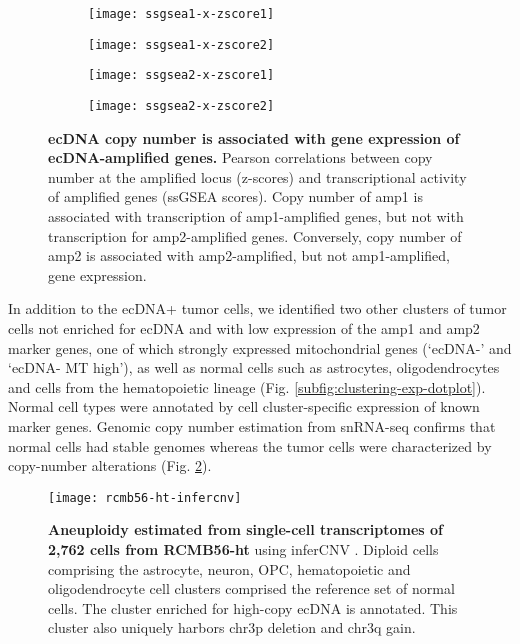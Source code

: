 \begin{figure}[!h]
    \centering
    \begin{subfigure}{.49\textwidth}
        \centering
        \texttt{[image: ssgsea1-x-zscore1]}
        \caption{}
    \end{subfigure}
    \begin{subfigure}{.49\textwidth}
        \centering
        \texttt{[image: ssgsea1-x-zscore2]}
        \caption{}
    \end{subfigure}
    \begin{subfigure}{.49\textwidth}
        \centering
        \texttt{[image: ssgsea2-x-zscore1]}
        \caption{}
    \end{subfigure}
    \begin{subfigure}{.49\textwidth}
        \centering
        \texttt{[image: ssgsea2-x-zscore2]}
        \caption{}
    \end{subfigure}
    \caption[ecDNA copy number is associated with gene expression of ecDNA-amplified genes.]{\textbf{ecDNA copy number is associated with gene expression of ecDNA-amplified genes.} Pearson correlations between copy number at the amplified locus (z-scores) and transcriptional activity of amplified genes (ssGSEA scores). Copy number of amp1 is associated with transcription of amp1-amplified genes, but not with transcription for amp2-amplified genes. Conversely, copy number of amp2 is associated with amp2-amplified, but not amp1-amplified, gene expression. 
    }
    \label{fig:ssgsea-x-zscores}
\end{figure}

In addition to the ecDNA+ tumor cells, we identified two other clusters of tumor cells not enriched for ecDNA and with low expression of the amp1 and amp2 marker genes, one of which strongly expressed mitochondrial genes (`ecDNA-' and `ecDNA- MT high'), as well as normal cells such as astrocytes, oligodendrocytes and cells from the hematopoietic lineage (Fig. \ref{subfig:clustering-exp-dotplot}). Normal cell types were annotated by cell cluster-specific expression of known marker genes. Genomic copy number estimation from snRNA-seq confirms that normal cells had stable genomes whereas the tumor cells were characterized by copy-number alterations (Fig. \ref{fig:rcmb56-ht-infercnv}). 

\begin{figure}[!h]
    \centering
    \texttt{[image: rcmb56-ht-infercnv]}
    \caption[Aneuploidy estimated from single-cell transcriptomes of 2,762 cells from RCMB56-ht]{\textbf{Aneuploidy estimated from single-cell transcriptomes of 2,762 cells from RCMB56-ht} using inferCNV \cite{inferCNV_2019}. Diploid cells comprising the astrocyte, neuron, OPC, hematopoietic and oligodendrocyte cell clusters comprised the reference set of normal cells. The cluster enriched for high-copy ecDNA is annotated. This cluster also uniquely harbors chr3p deletion and chr3q gain.}
    \label{fig:rcmb56-ht-infercnv}
\end{figure}

